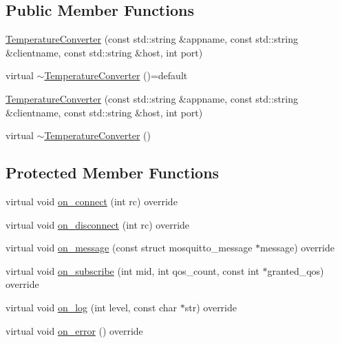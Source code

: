 \subsection*{Public Member Functions}
\begin{DoxyCompactItemize}
\item 
\hyperlink{class_temperature_converter_ad34b42abb624d7d4184f6e47dc1ad200}{Temperature\+Converter} (const std\+::string \&appname, const std\+::string \&clientname, const std\+::string \&host, int port)
\item 
virtual \hyperlink{class_temperature_converter_a60e728c5cd240024de4c010e92be8dda}{$\sim$\+Temperature\+Converter} ()=default
\item 
\hyperlink{class_temperature_converter_ad34b42abb624d7d4184f6e47dc1ad200}{Temperature\+Converter} (const std\+::string \&appname, const std\+::string \&clientname, const std\+::string \&host, int port)
\item 
virtual \hyperlink{class_temperature_converter_a4450d027b1c5041e33b4dffb30efb9f1}{$\sim$\+Temperature\+Converter} ()
\end{DoxyCompactItemize}
\subsection*{Protected Member Functions}
\begin{DoxyCompactItemize}
\item 
virtual void \hyperlink{class_temperature_converter_a2873aa81d1480326e797333649ad7612}{on\+\_\+connect} (int rc) override
\item 
virtual void \hyperlink{class_temperature_converter_aed2c87d3bea3cdc71b16932a5deb685a}{on\+\_\+disconnect} (int rc) override
\item 
virtual void \hyperlink{class_temperature_converter_abe798ee6c4861d708fdbf845682a55f4}{on\+\_\+message} (const struct mosquitto\+\_\+message $\ast$message) override
\item 
virtual void \hyperlink{class_temperature_converter_a19e82377ed204cd11e63df20368c7c07}{on\+\_\+subscribe} (int mid, int qos\+\_\+count, const int $\ast$granted\+\_\+qos) override
\item 
virtual void \hyperlink{class_temperature_converter_a570e3818402e2bbba5d5ecb6529423f3}{on\+\_\+log} (int level, const char $\ast$str) override
\item 
virtual void \hyperlink{class_temperature_converter_ac7fc38707aea9dc09145de054c89ffd1}{on\+\_\+error} () override
\end{DoxyCompactItemize}
